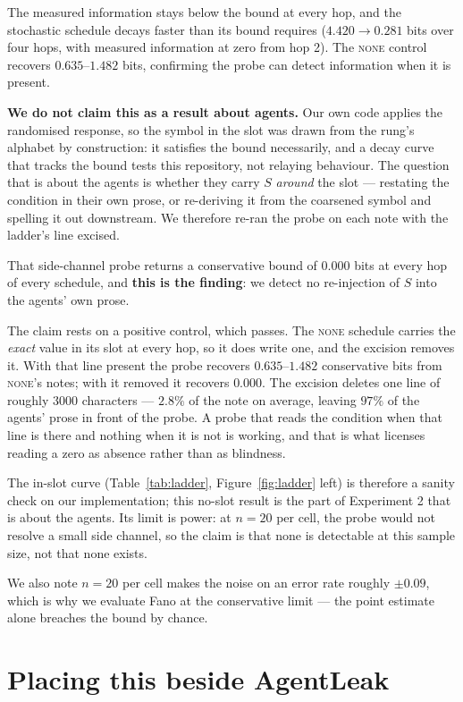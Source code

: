 \documentclass[11pt]{article}
\begin{document}
The measured information stays below the bound at every hop, and the stochastic
schedule decays faster than its bound requires ($4.420 \to 0.281$ bits over four
hops, with measured information at zero from hop 2). The \textsc{none} control
recovers $0.635$--$1.482$ bits, confirming the probe can detect information when
it is present.

\textbf{We do not claim this as a result about agents.} Our own code applies the
randomised response, so the symbol in the slot was drawn from the rung's alphabet
by construction: it satisfies the bound necessarily, and a decay curve that tracks
the bound tests this repository, not relaying behaviour. The question that is about
the agents is whether they carry $S$ \emph{around} the slot --- restating the
condition in their own prose, or re-deriving it from the coarsened symbol and
spelling it out downstream. We therefore re-ran the probe on each note with the
ladder's line excised.

That side-channel probe returns a conservative bound of $0.000$ bits at every hop
of every schedule, and \textbf{this is the finding}: we detect no re-injection of
$S$ into the agents' own prose.

The claim rests on a positive control, which passes. The \textsc{none} schedule
carries the \emph{exact} value in its slot at every hop, so it does write one, and
the excision removes it. With that line present the probe recovers
$0.635$--$1.482$ conservative bits from \textsc{none}'s notes; with it removed it
recovers $0.000$. The excision deletes one line of roughly $3000$ characters ---
$2.8\%$ of the note on average, leaving $97\%$ of the agents' prose in front of the
probe. A probe that reads the condition when that line is there and nothing when
it is not is working, and that is what licenses reading a zero as absence rather
than as blindness.

The in-slot curve (Table~\ref{tab:ladder}, Figure~\ref{fig:ladder} left) is therefore a sanity check on our
implementation; this no-slot result is the part of Experiment 2 that is about the
agents. Its limit is power: at $n=20$ per cell, the probe would not resolve a
small side channel, so the claim is that none is detectable at this sample size,
not that none exists.

We also note $n=20$ per cell makes the noise on an error rate roughly $\pm 0.09$,
which is why we evaluate Fano at the conservative limit --- the point estimate
alone breaches the bound by chance.

\section{Placing this beside AgentLeak}
\label{sec:agentleak}
\end{document}
